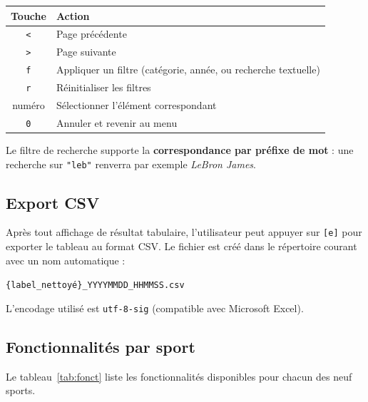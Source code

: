 \documentclass[12pt,a4paper]{article}
\newcommand{\code}[1]{\texttt{#1}}
\begin{document}
\begin{center}
\begin{tabular}{cl}
  \toprule
  \textbf{Touche} & \textbf{Action} \\
  \midrule
  \code{<} & Page précédente \\
  \code{>} & Page suivante \\
  \code{f} & Appliquer un filtre (catégorie, année, ou recherche textuelle) \\
  \code{r} & Réinitialiser les filtres \\
  numéro   & Sélectionner l'élément correspondant \\
  \code{0} & Annuler et revenir au menu \\
  \bottomrule
\end{tabular}
\end{center}

Le filtre de recherche supporte la \textbf{correspondance par préfixe de mot} :
une recherche sur \code{"leb"} renverra par exemple \textit{LeBron James}.

\subsection{Export CSV}

Après tout affichage de résultat tabulaire, l'utilisateur peut appuyer sur
\code{[e]} pour exporter le tableau au format CSV. Le fichier est créé dans
le répertoire courant avec un nom automatique :

\begin{center}
  \code{\{label\_nettoyé\}\_YYYYMMDD\_HHMMSS.csv}
\end{center}

L'encodage utilisé est \code{utf-8-sig} (compatible avec Microsoft Excel).

\subsection{Fonctionnalités par sport}

Le tableau~\ref{tab:fonct} liste les fonctionnalités disponibles pour chacun
des neuf sports.
\end{document}
